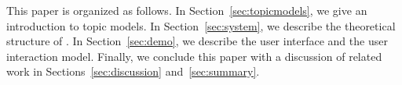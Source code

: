 This paper is organized as follows.
In Section~\ref{sec:topicmodels}, we give an introduction to topic models.
In Section~\ref{sec:system}, we describe the theoretical structure of \system.
In Section~\ref{sec:demo}, we describe the user interface and the user interaction model.
Finally, we conclude this paper with a discussion of related work in Sections~\ref{sec:discussion} and~\ref{sec:summary}.





